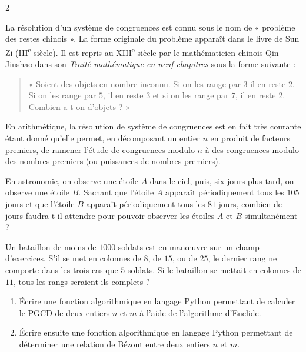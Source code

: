 \documentclass[a4paper,12pt]{article}
\begin{document}
\begin{multicols}{2}
    \begin{history}[title=Histoire : Problème des restes chinois]{}
    La résolution d’un système de congruences est connu sous le nom de « problème des restes chinois ». La forme originale du problème apparaît dans le livre de Sun Zi (III\textsuperscript{e} siècle). Il est repris au XIII\textsuperscript{e} siècle par le mathématicien chinois Qin Jiushao dans son \emph{Traité mathématique en neuf chapitres} sous la forme suivante :
    \begin{quote}
    « Soient des objets en nombre inconnu. Si on les range par $3$ il en reste $2$. Si on les range par $5$, il en reste $3$ et si on les range par $7$, il en reste $2$. Combien a-t-on d’objets ? »
    \end{quote}
    En arithmétique, la résolution de système de congruences est en fait très courante étant donné qu’elle permet, en décomposant un entier $n$ en produit de facteurs premiers, de ramener l’étude de congruences modulo $n$ à des congruences modulo des nombres premiers (ou puissances de nombres premiers).
    \end{history}
    
    \begin{exercice}[title=Exercice 32 $\quad \star \star \star \quad$ { [Modéliser, Calculer, Raisonner] }]{}{}
    En astronomie, on observe une étoile $A$ dans le ciel, puis, six jours plus tard, on observe une étoile $B$. Sachant que l’étoile $A$ apparaît périodiquement tous les $105$ jours et que l’étoile $B$ apparaît périodiquement tous les $81$ jours, combien de jours faudra-t-il attendre pour pouvoir observer les étoiles $A$ et $B$ simultanément ?
    \end{exercice}
    
    \begin{exercice}[title=Exercice 33 $\quad \star \star \star \quad$ { [Modéliser, Calculer, Raisonner] }]{}{}
    Un bataillon de moins de $1000$ soldats est en manœuvre sur un champ d’exercices. S’il se met en colonnes de $8$, de $15$, ou de $25$, le dernier rang ne comporte dans les trois cas que $5$ soldats. Si le bataillon se mettait en colonnes de $11$, tous les rangs seraient-ils complets ?
    \end{exercice}
    
    \begin{exercice}[title=Exercice 34 $\quad \star \star \star \quad$ { [Représenter] }]{}{}
    \begin{enumerate}
        \item Écrire une fonction algorithmique en langage Python permettant de calculer le PGCD de deux entiers $n$ et $m$ à l’aide de l’algorithme d’Euclide.
        \item Écrire ensuite une fonction algorithmique en langage Python permettant de déterminer une relation de Bézout entre deux entiers $n$ et $m$.
    \end{enumerate}
    \end{exercice}
    
\end{multicols}
\end{document}
